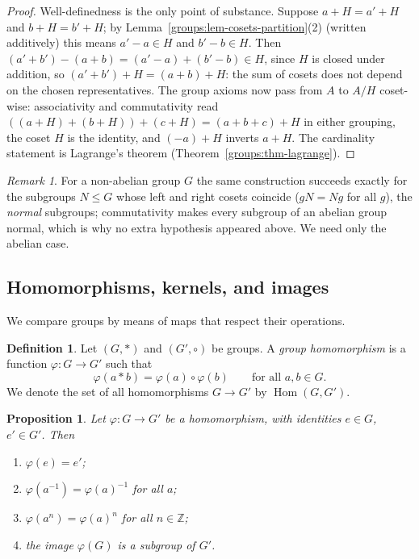 \documentclass[11pt,a4paper]{article}
\newtheorem{proposition}[theorem]{Proposition}
\theoremstyle{definition}
\newtheorem{definition}[theorem]{Definition}
\theoremstyle{remark}
\newtheorem{remark}[theorem]{Remark}
\newcommand{\Z}{\ensuremath{\mathbb{Z}}}
\DeclareMathOperator{\Hom}{Hom}
\begin{document}
\begin{proof}
Well-definedness is the only point of substance. Suppose \(a + H = a' + H\) and \(b + H = b' + H\); by Lemma~\ref{groups:lem-cosets-partition}(2) (written additively) this means \(a' - a \in H\) and \(b' - b \in H\). Then \((a' + b') - (a + b) = (a' - a) + (b' - b) \in H\), since \(H\) is closed under addition, so \((a'+b') + H = (a+b) + H\): the sum of cosets does not depend on the chosen representatives. The group axioms now pass from \(A\) to \(A/H\) coset-wise: associativity and commutativity read \(((a+H)+(b+H))+(c+H) = (a+b+c)+H\) in either grouping, the coset \(H\) is the identity, and \((-a)+H\) inverts \(a+H\). The cardinality statement is Lagrange's theorem (Theorem~\ref{groups:thm-lagrange}).
\end{proof}

\begin{remark}\label{groups:rem-quotient-nonabelian}
For a non-abelian group \(G\) the same construction succeeds exactly for the subgroups \(N \le G\) whose left and right cosets coincide (\(gN = Ng\) for all \(g\)), the \emph{normal} subgroups; commutativity makes every subgroup of an abelian group normal, which is why no extra hypothesis appeared above. We need only the abelian case.
\end{remark}

\subsection{Homomorphisms, kernels, and images}

We compare groups by means of maps that respect their operations.

\begin{definition}\label{groups:def-hom}
Let \((G,\ast)\) and \((G',\circ)\) be groups. A \emph{group homomorphism} is a function \(\varphi \colon G \to G'\) such that
\[
\varphi(a \ast b) = \varphi(a) \circ \varphi(b) \qquad \text{for all } a,b \in G.
\]
We denote the set of all homomorphisms \(G \to G'\) by \(\Hom(G,G')\).
\end{definition}

\begin{proposition}\label{groups:prop-hom-basic}
Let \(\varphi \colon G \to G'\) be a homomorphism, with identities \(e \in G\), \(e' \in G'\). Then
\begin{enumerate}
\item \(\varphi(e) = e'\);
\item \(\varphi(a^{-1}) = \varphi(a)^{-1}\) for all \(a\);
\item \(\varphi(a^n) = \varphi(a)^n\) for all \(n \in \Z\);
\item the image \(\varphi(G)\) is a subgroup of \(G'\).
\end{enumerate}
\end{proposition}
\end{document}
